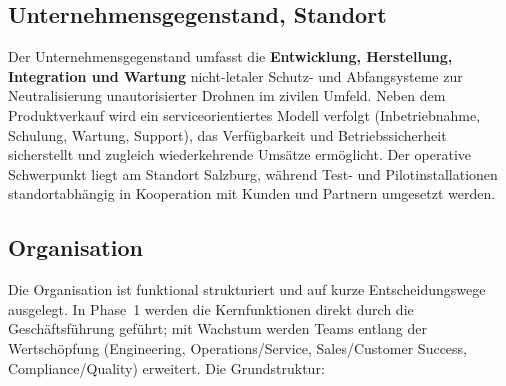 \documentclass[11pt,a4paper]{article}
\begin{document}
\subsection{Unternehmensgegenstand, Standort}
Der Unternehmensgegenstand umfasst die \textbf{Entwicklung, Herstellung, Integration und Wartung} nicht-letaler Schutz- und Abfangsysteme zur Neutralisierung unautorisierter Drohnen im zivilen Umfeld. Neben dem Produktverkauf wird ein serviceorientiertes Modell verfolgt (Inbetriebnahme, Schulung, Wartung, Support), das Verfügbarkeit und Betriebssicherheit sicherstellt und zugleich wiederkehrende Umsätze ermöglicht. Der operative Schwerpunkt liegt am Standort Salzburg, während Test- und Pilotinstallationen standortabhängig in Kooperation mit Kunden und Partnern umgesetzt werden.

\subsection{Organisation}
Die Organisation ist funktional strukturiert und auf kurze Entscheidungswege ausgelegt. In Phase~1 werden die Kernfunktionen direkt durch die Geschäftsführung geführt; mit Wachstum werden Teams entlang der Wertschöpfung (Engineering, Operations/Service, Sales/Customer Success, Compliance/Quality) erweitert. Die Grundstruktur:
\end{document}
